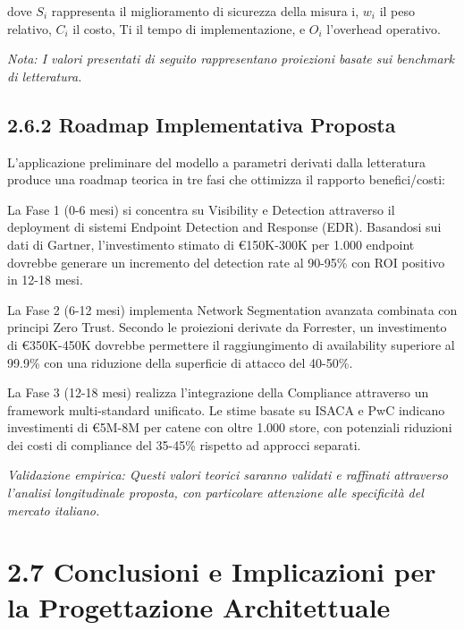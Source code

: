 dove $S_i$ rappresenta il miglioramento di sicurezza della misura i, $w_i$ il
peso relativo, $C_i$ il costo, Ti il tempo di implementazione, e $O_i$
l'overhead operativo.

\emph{Nota: I valori presentati di seguito rappresentano proiezioni basate
sui benchmark di letteratura.}

\subsection{\texorpdfstring{2.6.2 Roadmap Implementativa Proposta}{2.6.2 Roadmap Implementativa Proposta}}\label{roadmap-implementativa-proposta}

L'applicazione preliminare del modello a parametri derivati dalla
letteratura\supercite{mckinsey2024retail} produce una roadmap teorica in tre fasi che ottimizza il
rapporto benefici/costi:

La Fase 1 (0-6 mesi) si concentra su Visibility e Detection attraverso
il deployment di sistemi Endpoint Detection and Response (EDR).
Basandosi sui dati di Gartner\supercite{gartner2024edr}, l'investimento stimato di €150K-300K
per 1.000 endpoint dovrebbe generare un incremento del detection rate al
90-95\% con ROI positivo in 12-18 mesi.

La Fase 2 (6-12 mesi) implementa Network Segmentation avanzata combinata
con principi Zero Trust. Secondo le proiezioni derivate da Forrester\supercite{forrester2024zerotrust},
un investimento di €350K-450K dovrebbe permettere il raggiungimento di
availability superiore al 99.9\% con una riduzione della superficie di
attacco del 40-50\%.

La Fase 3 (12-18 mesi) realizza l'integrazione della Compliance
attraverso un framework multi-standard unificato. Le stime basate su
ISACA\supercite{isaca2024compliance} e PwC\supercite{pwc2024integrated} indicano investimenti di €5M-8M per catene con oltre
1.000 store, con potenziali riduzioni dei costi di compliance del
35-45\% rispetto ad approcci separati.

\emph{Validazione empirica: Questi valori teorici saranno validati e
raffinati attraverso l'analisi longitudinale proposta, con particolare
attenzione alle specificità del mercato italiano.}

\section{\texorpdfstring{2.7 Conclusioni e Implicazioni per la Progettazione Architettuale}{2.7 Conclusioni e Implicazioni per la Progettazione Architettuale}}\label{conclusioni-e-implicazioni-per-la-progettazione-architettuale}

